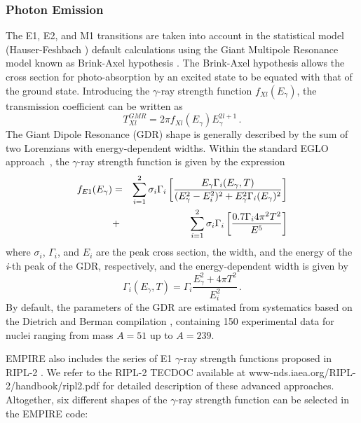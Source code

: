 \subsubsection{Photon Emission}

The E1, E2, and M1 transitions are taken into account in the statistical
model (Hauser-Feshbach%
) default calculations using the Giant Multipole
Resonance model known as Brink-Axel hypothesis \cite{Axel,Brink,Brinka}. The
Brink-Axel hypothesis allows the cross section for photo-absorption by an
excited state to be equated with that of the ground state. Introducing the $%
\gamma$-ray strength function $f_{Xl}(E_{\gamma})$, the transmission
coefficient can be written as
\begin{equation}
T_{Xl}^{GMR}=2\pi f_{Xl}(E_{\gamma})E_{\gamma}^{2l+1}\,.  \label{tgGMR}
\end{equation}
The Giant Dipole Resonance (GDR) shape is generally described by the sum of
two Lorenzians with energy-dependent widths. Within the standard EGLO
approach~\cite{kop01}, the $\gamma$-ray strength function is given by the
expression \noindent
\begin{eqnarray}
f_{E1}(E_{\gamma})&=&\sum_{i=1}^{2}\sigma_{i}\Gamma_{i}\left[%
\frac{E_{\gamma}\Gamma_{i}(E_{\gamma},T)}{(E_{\gamma}^{2}-E_{i}^{2})^{2}+E_{%
\gamma}^{2}\Gamma_{i}(E_{\gamma})^{2}}\right]  \notag \\
&+&\sum_{i=1}^{2}\sigma_{i}\Gamma_{i}\left[\frac{0.7\Gamma_{i}4\pi^{2}T^{2}}{%
E^{5}}\right]  \label{lorenz}
\end{eqnarray}
\noindent where $\sigma_{i}$, $\Gamma_{i}$, and $E_{i}$ are the peak cross
section, the width, and the energy of the \emph{i}-th peak of the GDR,
respectively, and
the energy-dependent width is given by
\begin{equation}
\Gamma_{i}(E_{\gamma},T)=\Gamma_{i}\frac{E_{\gamma}^{2}+4\pi T^{2}}{E_{i}^{2}%
}\,.
\end{equation}
By default, the parameters of the GDR are estimated from systematics
based on the Dietrich and Berman compilation \cite{die88}, containing 150
experimental data for nuclei ranging from mass $A=51$ up to $A=239$.

EMPIRE also includes the series of E1 $\gamma$-ray strength functions proposed
in RIPL-2 \cite{RIPL2}. We refer to the RIPL-2 TECDOC available at
www-nds.iaea.org/RIPL-2/handbook/ripl2.pdf for detailed description of these
advanced approaches. Altogether, six different shapes of the $\gamma$-ray
strength function can be selected in the EMPIRE code:

